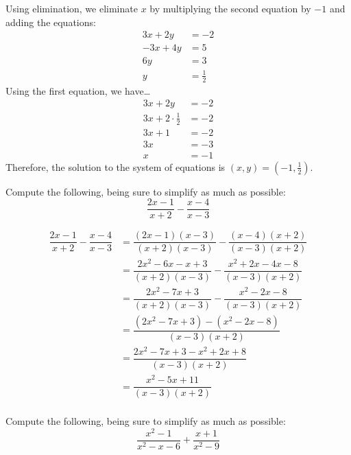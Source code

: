\documentclass[12pt,letterpaper]{exam}
\begin{document}
\begin{questions}
{Using elimination, we eliminate $x$ by multiplying the second equation by $-1$ and adding the equations:
	\[
	\begin{aligned}
	3x + 2y&= -2 \\
	-3x + 4y&= 5 \\ \hline
	6y&= 3 \\
	y&= \frac{1}{2}
	\end{aligned}
	\] 
Using the first equation, we have\dots
	\[
	\begin{aligned}
	3x + 2y&= -2 \\
	3x + 2 \cdot \frac{1}{2}&= -2 \\
	3x + 1&= -2 \\
	3x&= -3 \\
	x&= -1
	\end{aligned}
	\] 
Therefore, the solution to the system of equations is $(x, y)= (-1, \frac{1}{2})$. 
}



\newpage
\question[6] Compute the following, being sure to simplify as much as possible:
	\[
	\dfrac{2x - 1}{x + 2} - \dfrac{x - 4}{x - 3}
	\] \pspace

	\[
	\begin{aligned}
	\dfrac{2x - 1}{x + 2} - \dfrac{x - 4}{x - 3}&= \dfrac{(2x - 1)(x - 3)}{(x + 2)(x - 3)} - \dfrac{(x - 4)(x + 2)}{(x - 3)(x + 2)} \\[0.3cm]
	&= \dfrac{2x^2 - 6x - x + 3}{(x + 2)(x - 3)} - \dfrac{x^2 + 2x - 4x - 8}{(x - 3)(x + 2)} \\[0.3cm]
	&= \dfrac{2x^2 - 7x + 3}{(x + 2)(x - 3)} - \dfrac{x^2 - 2x - 8}{(x - 3)(x + 2)} \\[0.3cm]
	&= \dfrac{(2x^2 - 7x + 3) - (x^2 - 2x - 8)}{(x - 3)(x + 2)} \\[0.3cm]
	&= \dfrac{2x^2 - 7x + 3 - x^2 + 2x + 8}{(x - 3)(x + 2)} \\[0.3cm]
	&= \dfrac{x^2 - 5x + 11}{(x - 3)(x + 2)} \\[0.3cm]
	\end{aligned}
	\]



\newpage
\question[6] Compute the following, being sure to simplify as much as possible:
	\[
	\dfrac{x^2 - 1}{x^2 - x - 6} + \dfrac{x + 1}{x^2 - 9}
	\]
	

\end{questions}
\end{document}
